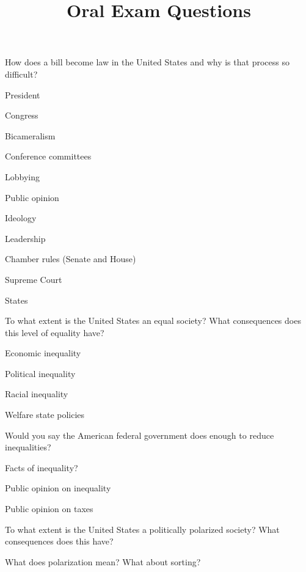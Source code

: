\documentclass[12pt,a4paper]{article}
\title{Oral Exam Questions}
\author{}
\date{}
\begin{document}
\maketitle

\onehalfspacing

\begin{enumerate}
\item How does a bill become law in the United States and why is that process so difficult?
	\item Supreme Court
	\item States
	\end{itemize*}
\item To what extent is the United States an equal society? What consequences does this level of equality have?
	\begin{itemize*}
	\item Economic inequality
	\item Political inequality
	\item Racial inequality
	\item Welfare state policies
	\end{itemize*}
\item Would you say the American federal government does enough to reduce inequalities?
	\begin{itemize*}
	\item Facts of inequality?
	\item Public opinion on inequality
	\item Public opinion on taxes
	\end{itemize*}
\item To what extent is the United States a politically polarized society? What consequences does this have?
	\begin{itemize*}
	\item What does polarization mean? What about sorting?

\end{itemize*}
\end{enumerate}
\end{document}
